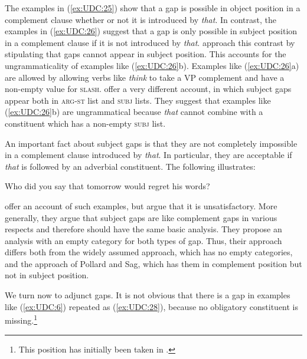\documentclass[output=paper
,notxmath 
 	        ,biblatex
                ,babelshorthands
                ,newtxmath
                ,draftmode
                ,colorlinks, citecolor=brown
]{langscibook}
\begin{document}
\noindent
The examples in (\ref{ex:UDC:25}) show that a gap is possible in
object position in a complement clause whether or not it is introduced
by \emph{that}.
In contrast, the examples in (\ref{ex:UDC:26}) suggest
that a gap is only possible in subject position in a complement clause
if it is not introduced by
\emph{that}. \citet[Chapter~4.4]{Pollard:Sag:94} approach this
contrast by stipulating that gaps cannot appear in subject
position. This accounts for the ungrammaticality of examples like
(\ref{ex:UDC:26}b). Examples like (\ref{ex:UDC:26}a) are allowed by
allowing verbs like \textit{think} to take a VP complement and have a
non-empty value for
\textsc{slash}. \citet[Chapter~5.1.3]{Ginzburg:Sag:01} offer a very
different account, in which subject gaps appear both in
\textsc{arg-st} list and \textsc{subj} lists. They suggest that
examples like (\ref{ex:UDC:26}b) are ungrammatical because \emph{that}
cannot combine with a constituent which has a non-empty \textsc{subj}
list.

An important fact about subject gaps is that they are not completely
impossible in a complement clause introduced by \emph{that}. In
particular, they are acceptable if \emph{that} is followed by an
adverbial constituent. The following illustrates:

\begin{exe}
\ex \label{ex:UDC:27}
Who did you say that tomorrow \trace{} would regret his words?
\end{exe}

\noindent
\citet[Chapter~5.1.3]{Ginzburg:Sag:01} offer an account of such examples, but
\citet[Chapter~2.3.2]{Levine:Hukari:06} argue that it is unsatisfactory. More generally, they
argue that subject gaps are like complement gaps in various respects
and therefore should have the same basic analysis. They propose an
analysis with an empty category for both types of gap. Thus, their
approach differs both from the widely assumed approach, which has no
empty categories, and the approach of Pollard and Sag, which has them
in complement position but not in subject position.\label{udc:page-subject-gaps-end}

We turn now to adjunct gaps. It is not obvious that there is a gap in
examples like (\ref{ex:UDC:6}) repeated as (\ref{ex:UDC:28}), because
no obligatory constituent is missing.\footnote{This position has initially
  been taken in \citet[176--180]{Pollard:Sag:94}. } 
\end{document}

